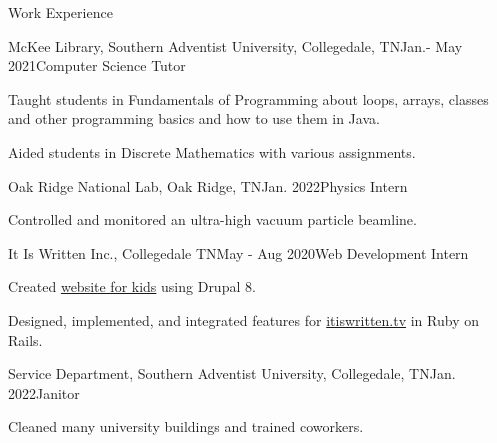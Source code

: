 \begin{rSection}{Work Experience}
	\begin{rSubsection}{McKee Library, Southern Adventist University, Collegedale, TN}{Jan.- May 2021}{Computer Science Tutor}{}
	 \item Taught students in Fundamentals of Programming about loops, arrays, classes and other programming basics and how to use them in Java.
	 \item Aided students in Discrete Mathematics with various assignments.
	\end{rSubsection}

	\begin{rSubsection}{Oak Ridge National Lab, Oak Ridge, TN}{Jan. 2022}{Physics Intern}{}
	 \item Controlled and monitored an ultra-high vacuum particle beamline.
	\end{rSubsection}

	\begin{rSubsection}{It Is Written Inc., Collegedale TN}{May - Aug 2020}{Web Development Intern}{}
		\item Created \href{https://buriedtreasure.fun/}{website for kids} using Drupal 8.
		\item Designed, implemented, and integrated features for \href{itiswritten.tv}{itiswritten.tv} in Ruby on Rails.
	\end{rSubsection}

	\begin{rSubsection}{Service Department, Southern Adventist University, Collegedale, TN}{Jan. 2022}{Janitor}{}
		\item Cleaned many university buildings and trained coworkers.
	\end{rSubsection}
	
\end{rSection}